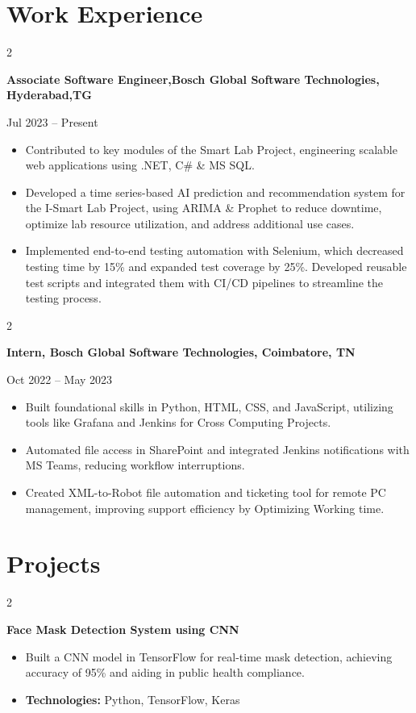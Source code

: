 \documentclass[10pt, letterpaper]{article}
\newenvironment{highlights}{
    \begin{itemize}[
        topsep=0.10 cm,
        parsep=0.10 cm,
        partopsep=0pt,
        itemsep=0pt,
        leftmargin=0 cm + 10pt
    ]
}{
    \end{itemize}
} %
\newenvironment{twocolentry}[2][]{
    \onecolentry
    \def\secondColumn{#2}
    \setcolumnwidth{\fill, 4.5 cm}
    \begin{paracol}{2}
}{
    \switchcolumn \raggedleft \secondColumn
    \end{paracol}
    \endonecolentry
} %
\begin{document}
    

\section{Work Experience}
\begin{twocolentry}{Jul 2023 – Present}
    \textbf{Associate Software Engineer,Bosch Global Software Technologies, Hyderabad,TG}
\end{twocolentry}
\begin{highlights}
    \item Contributed to key modules of the Smart Lab Project, engineering scalable web applications using .NET, C\# \& MS SQL.
    \item Developed a time series-based AI prediction and recommendation system for the I-Smart Lab Project, using ARIMA \& Prophet to reduce downtime, optimize lab resource utilization, and address additional use cases.
    \item Implemented end-to-end testing automation with Selenium, which decreased testing time by 15\% and expanded test coverage by 25\%. Developed reusable test scripts and integrated them with CI/CD pipelines to streamline the testing process.

\end{highlights}
\begin{twocolentry}{Oct 2022 – May 2023}
    \textbf{Intern, Bosch Global Software Technologies, Coimbatore, TN}
\end{twocolentry}
\begin{highlights}
    \item Built foundational skills in Python, HTML, CSS, and JavaScript, utilizing tools like Grafana and Jenkins for Cross Computing Projects.
    \item Automated file access in SharePoint and integrated Jenkins notifications with MS Teams, reducing workflow interruptions.
    \item Created XML-to-Robot file automation and ticketing tool for remote PC management, improving support efficiency by Optimizing Working time.
\end{highlights}


\section{Projects}

\begin{twocolentry}{}
    \textbf{Face Mask Detection System using CNN}
\end{twocolentry}
\begin{highlights}
    \item Built a CNN model in TensorFlow for real-time mask detection, achieving accuracy of 95\% and aiding in public health compliance.
    \item \textbf{Technologies:} Python, TensorFlow, Keras
\end{highlights}
\end{document}
